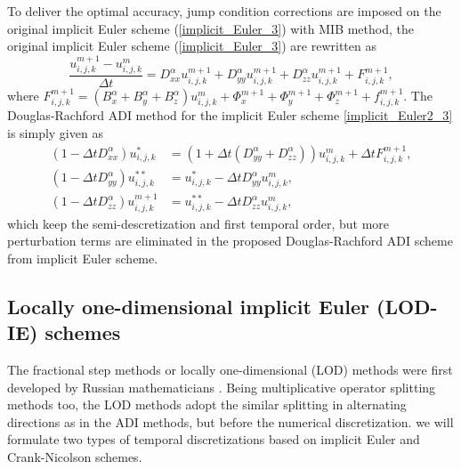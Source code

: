 \documentclass[dissertation]{uathesis}
\begin{document}
\begin{body}
To deliver the optimal accuracy, jump condition corrections are imposed on the original implicit Euler scheme (\ref{implicit_Euler_3}) with MIB method, the original implicit Euler scheme (\ref{implicit_Euler_3}) are rewritten as  
%
\begin{equation} \label{implicit_Euler2_3}
\frac{u^{m+1}_{i,j,k}-u^{m}_{i,j,k}}{\Delta t} = 
D^{\alpha}_{xx} u^{m+1}_{i,j,k} +D^{\alpha}_{yy} u^{m+1}_{i,j,k} +D^{\alpha}_{zz} u^{m+1}_{i,j,k} + F^{m+1}_{i,j,k},
\end{equation}
%
where $F^{m+1}_{i,j,k}=(B^{\alpha}_{x}+B^{\alpha}_{y}+B^{\alpha}_{z})u^{m}_{i,j,k}+\Phi^{m+1}_{x}+\Phi^{m+1}_{y}+\Phi^{m+1}_{z}+f^{m+1}_{i,j,k}$. The Douglas-Rachford ADI method for the implicit Euler scheme \eqref{implicit_Euler2_3} is simply given as 
%
\begin{align} \label{D_ADI_2_3}
(1-\Delta t D^{\alpha}_{xx}) u^{*}_{i,j,k}   &= (1 + \Delta t (D^{\alpha}_{yy} + D^{\alpha}_{zz})) u^{m}_{i,j,k} + \Delta t F^{m+1}_{i,j,k}, \nonumber \\
(1-\Delta t D^{\alpha}_{yy}) u^{**}_{i,j,k}  &= u^{*}_{i,j,k} - \Delta t D^{\alpha}_{yy} u^{m}_{i,j,k},  \\
(1-\Delta t D^{\alpha}_{zz}) u^{m+1}_{i,j,k} &= u^{**}_{i,j,k} - \Delta t D^{\alpha}_{zz} u^{m}_{i,j,k}, \nonumber
\end{align}
%
which keep the semi-descretization and first temporal order, but more perturbation terms are eliminated in the proposed Douglas-Rachford ADI scheme from implicit Euler scheme. 

\subsection{Locally one-dimensional implicit Euler (LOD-IE) schemes}
The fractional step methods or locally one-dimensional (LOD) methods were first developed by Russian mathematicians \cite{yanenki1971lod}. Being multiplicative operator splitting methods too, the LOD methods adopt the similar splitting in alternating directions as in the ADI methods, but before the numerical discretization. we will formulate two types of temporal discretizations based on implicit Euler and Crank-Nicolson schemes. 


\end{body}
\end{document}
